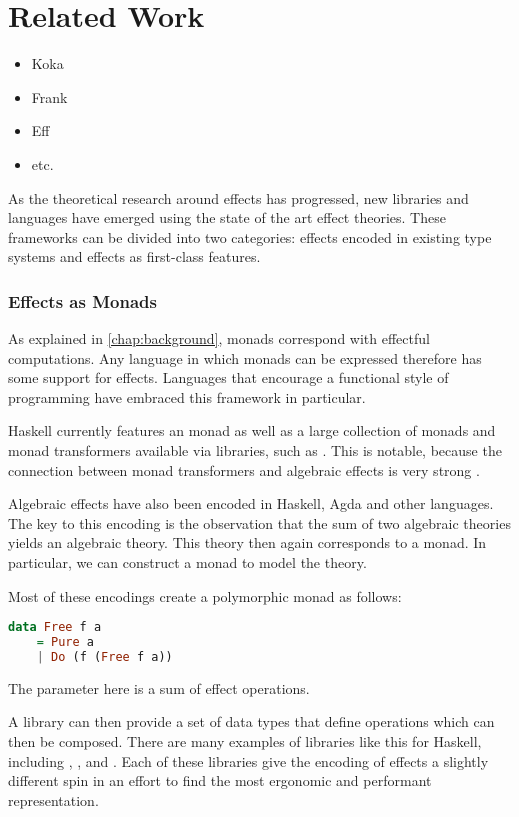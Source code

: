 \chapter{Related Work}\label{chap:related_work}

\begin{itemize}
\item Koka
\item Frank
\item Eff
\item etc.
\end{itemize}

As the theoretical research around effects has progressed, new libraries and languages have emerged using the state of the art effect theories. These frameworks can be divided into two categories: effects encoded in existing type systems and effects as first-class features.

\subsection{Effects as Monads}

As explained in \ref{chap:background}, monads correspond with effectful computations. Any language in which monads can be expressed therefore has some support for effects. Languages that encourage a functional style of programming have embraced this framework in particular.

Haskell currently features an  monad \autocite{peyton_jones_imperative_1993} as well as a large collection of monads and monad transformers available via libraries, such as . This is notable, because the connection between monad transformers and algebraic effects is very strong \autocite{schrijvers_monad_2019}.

Algebraic effects have also been encoded in Haskell, Agda and other languages. The key to this encoding is the observation that the sum of two algebraic theories yields an algebraic theory. This theory then again corresponds to a monad. In particular, we can construct a  monad to model the theory.

Most of these encodings create a polymorphic  monad as follows:
\begin{lstlisting}[language=haskell]
data Free f a
    = Pure a
    | Do (f (Free f a))
\end{lstlisting}
The parameter  here is a sum of effect operations.

A library can then provide a set of data types that define operations which can then be composed. There are many examples of libraries like this for Haskell, including , ,  and . Each of these libraries give the encoding of effects a slightly different spin in an effort to find the most ergonomic and performant representation.

